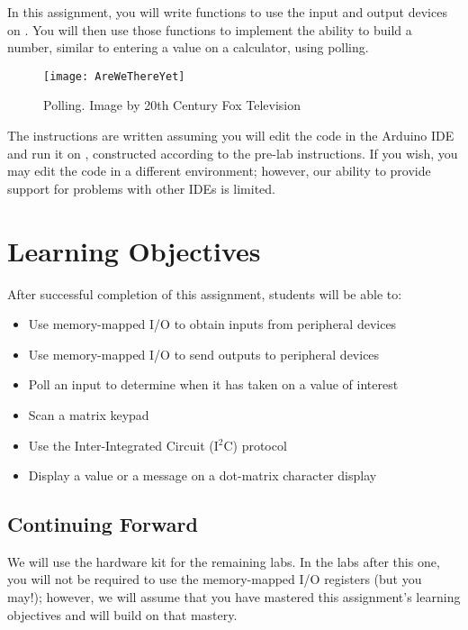 In this assignment, you will write functions to use the input and output devices on \runtimeenvironment.
You will then use those functions to implement the ability to build a number, similar to entering a value on a calculator, using polling.

\begin{figure}[h]
    \centering
    \texttt{[image: AreWeThereYet]}
    \caption{Polling. \tiny Image by 20th Century Fox Television}
\end{figure}

The instructions are written assuming you will edit the code in the Arduino IDE and run it on \runtimeenvironment, constructed according to the pre-lab instructions.
If you wish, you may edit the code in a different environment; however, our ability to provide support for problems with other IDEs is limited.

\section*{Learning Objectives}

After successful completion of this assignment, students will be able to:
\begin{itemize}
\item Use memory-mapped I/O to obtain inputs from peripheral devices
\item Use memory-mapped I/O to send outputs to peripheral devices
\item Poll an input to determine when it has taken on a value of interest
\item Scan a matrix keypad
\item Use the Inter-Integrated Circuit (I$^2$C) protocol
\item Display a value or a message on a dot-matrix character display
\end{itemize}

\subsection*{Continuing Forward}

We will use the hardware kit for the remaining labs.
In the labs after this one, you will not be required to use the memory-mapped I/O registers (but you may!);
however, we will assume that you have mastered this assignment's learning objectives and will build on that mastery.

